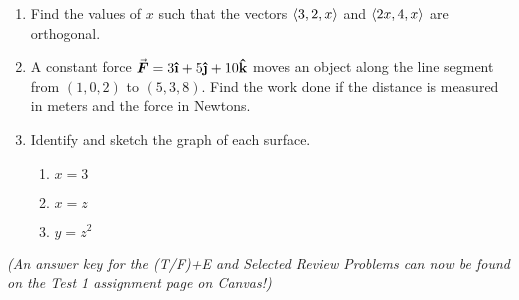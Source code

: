 \begin{enumerate}
\item Find the values of \(x\) such that the vectors \(\langle3, 2, x\rangle\) and \(\langle2x, 4, x\rangle\) are orthogonal. \label{prob12}%

\item A constant force \(\vec{F} = 3\ihat + 5\jhat + 10 \khat\) moves an object along the line segment from \((1, 0, 2)\) to \((5, 3, 8)\). Find the work done if the distance is measured in meters and the force in Newtons. \label{prob13}%

\item Identify and sketch the graph of each surface. \label{prob14}%
\begin{enumerate}
\item \(x = 3\) \label{prob14a}%
\item \(x=z\) \label{prob14b}%
\item \(y = z^2\) \label{prob14c}%
\end{enumerate}


\end{enumerate}

\vfill
\textit{(An answer key for the (T/F)+E and Selected Review Problems can now be found on the Test 1 assignment page on Canvas!)}

